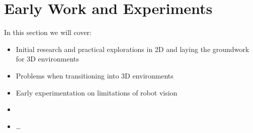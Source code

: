 \chapter{Early Work and Experiments}
In this section we will cover:
  \begin{itemize}
    \item Initial research and practical explorations in 2D and laying the groundwork for 3D environments
    \item Problems when transitioning into 3D environments
    \item Early experimentation on limitations of robot vision
    \item 
    \item \ldots
  \end{itemize}


